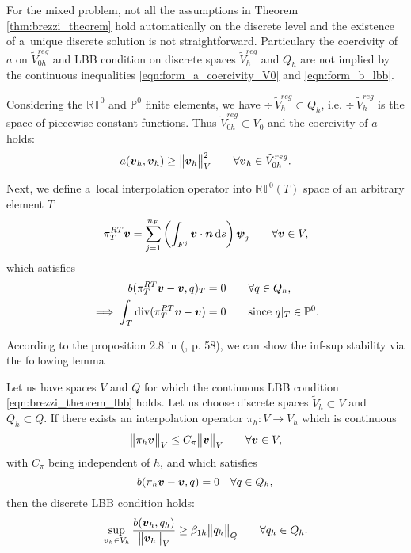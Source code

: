 For the mixed problem, not all the assumptions in Theorem \ref{thm:brezzi_theorem}
hold automatically on the discrete level and the existence of a~unique discrete solution is not straightforward.
Particulary the coercivity of $a$ on $\tilde V_{0h}^{reg}$
and LBB condition on discrete spaces $\tilde V_h^{reg}$ and $Q_h$ are not implied by the continuous inequalities
\eqref{eqn:form_a_coercivity_V0} and \eqref{eqn:form_b_lbb}.

Considering the $\mathbb{RT}^0$ and $\mathbb P^0$ finite elements,
we have $\div\,\tilde V_{h}^{reg}\subset Q_h$, i.e. $\div\, \tilde V_h^{reg}$ is the space of piecewise constant functions.
Thus $\tilde V_{0h}^{reg} \subset V_0$ and the coercivity of $a$ holds:
\begin{equation}
a(\mathbf{\boldsymbol{v}}_h,\mathbf{\boldsymbol{v}}_h)\geq \bigl\Vert\mathbf{\boldsymbol{v}}_h\bigr\Vert^2_V  \qquad \forall \mathbf{\boldsymbol{v}}_h\in \tilde V_{0h}^{reg}.
\end{equation}


Next, we define a~local interpolation operator into $\mathbb{RT}^0(T)$ space of an arbitrary element $T$
\begin{equation}
    \pi^{RT}_T\mathbf{\boldsymbol{v}} = \sum_{j=1}^{n_F} \left( \int_{F^j} \mathbf{\boldsymbol{v}} \cdot \mathbf{\boldsymbol{n}} \,{\rm d} s \right)  \mathbf{\boldsymbol{\psi}}_j
    \qquad \forall \mathbf{\boldsymbol{v}} \in V, \label{eqn:local_rt_interpolator}
\end{equation}
which satisfies
\begin{align}
b(\pi^{RT}_T\mathbf{\boldsymbol{v}}- \mathbf{\boldsymbol{v}}, q)_T &= 0 \qquad \forall q\in Q_h,\\ 
\implies \int_T {\rm div}(\pi^{RT}_T\mathbf{\boldsymbol{v}}- \mathbf{\boldsymbol{v}}) &= 0 \qquad \textrm{since } q|_T\in \mathbb{P}^0.
\end{align}

According to the proposition 2.8 in (\cite{brezzi_mixed_1991}, p. 58),
we can show the inf-sup stability via the following lemma
\begin{lemma} \label{lem:discrete_inf_sup_interpolant}
Let us have spaces $V$ and $Q$ for which the continuous LBB condition \eqref{eqn:brezzi_theorem_lbb} holds.
Let us choose discrete spaces $\tilde V_h\subset V$ and $Q_h\subset Q$.
If there exists an interpolation operator
$\pi_h: V\rightarrow V_h$ which is continuous
\begin{equation}
    \bigl\Vert\pi_h \mathbf{\boldsymbol{v}}\bigr\Vert_V \leq C_\pi \bigl\Vert\mathbf{\boldsymbol{v}}\bigr\Vert_V \qquad \forall \mathbf{\boldsymbol{v}}\in V,
\end{equation}
with $C_\pi$ being independent of $h$, and which satisfies
\begin{equation}
    b(\pi_h\mathbf{\boldsymbol{v}}- \mathbf{\boldsymbol{v}}, q) = 0 \quad \forall q\in Q_h,\\ 
\end{equation}
then the discrete LBB condition holds:
\begin{equation}
    \sup_{\mathbf{\boldsymbol{v}}_h\in V_h} \frac{b(\mathbf{\boldsymbol{v}}_h,q_h)}{\bigl\Vert\mathbf{\boldsymbol{v}}_h\bigr\Vert_V}
    \geq \beta_{1h}\bigl\Vert q_h\bigr\Vert_Q \qquad \forall q_h\in Q_h.
\end{equation}
\end{lemma}


